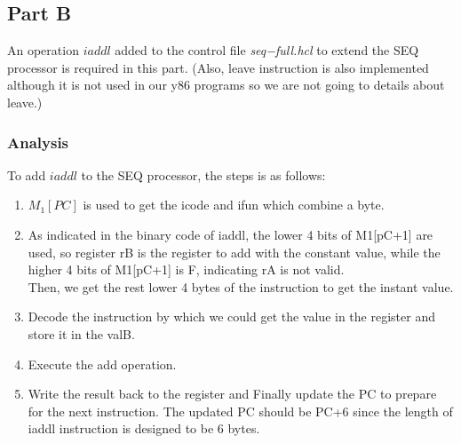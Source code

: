\documentclass{article}
\begin{document}
\subsection{Part B}
An operation $iaddl$ added to the control file \textit{seq−full.hcl} to extend the SEQ processor is required in this part. (Also, leave instruction is also implemented although it is not used in our y86 programs so we are not going to details about leave.)
\subsubsection{Analysis}
To add $iaddl$ to the SEQ processor, the steps is as follows:

\begin{enumerate}
\item $M_1[PC]$ is used to get the icode and ifun which combine a byte.
\item  As indicated in the binary code of iaddl, the lower 4 bits of M1[pC+1] are used, so register rB is the register to add with the constant value, while the higher 4 bits of M1[pC+1] is F, indicating rA is not valid. \\
    Then, we get the rest lower 4 bytes of the instruction to get the instant value.
\item Decode the instruction by which we could get the value in the register and store it in the valB.
\item Execute the add operation.
\item Write the result back to the register and Finally update the PC to prepare for the next instruction. The updated PC should be PC+6 since the length of iaddl instruction is designed to be 6 bytes.
\end{enumerate}
\end{document}
